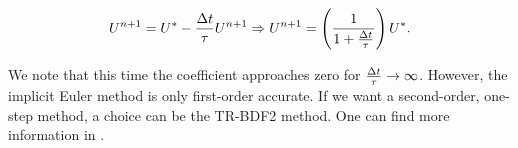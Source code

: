 \documentclass[journal,onecolumn]{IEEEtran}
\begin{document}
\begin{equation}
	U^{n+1}=U^*-\frac{\Delta t}{\tau}U^{n+1}\Rightarrow U^{n+1} = \left(\frac{1}{1+\frac{\Delta t}{\tau}}\right)U^*.
\end{equation}

We note that this time the coefficient approaches zero for $\frac{\Delta t }{\tau}\rightarrow\infty$. However, the implicit Euler method is only first-order accurate. If we want a second-order, one-step method, a choice can be the TR-BDF2 method. One can find more information in \cite{leveque}.


%



\ifCLASSOPTIONcaptionsoff
	\newpage
\fi
\end{document}
